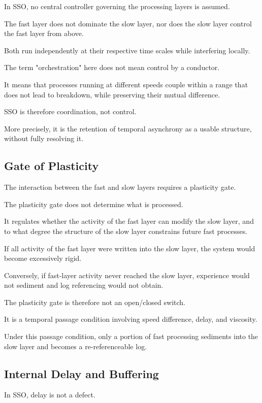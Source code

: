 In SSO, no central controller governing the processing layers is assumed.

The fast layer does not dominate the slow layer, nor does the slow layer control the fast layer from above.

Both run independently at their respective time scales while interfering locally.

The term "orchestration" here does not mean control by a conductor.

It means that processes running at different speeds couple within a range that does not lead to breakdown, while preserving their mutual difference.

SSO is therefore coordination, not control.

More precisely, it is the retention of temporal asynchrony as a usable structure, without fully resolving it.

\subsection{Gate of Plasticity}


The interaction between the fast and slow layers requires a plasticity gate.

The plasticity gate does not determine what is processed.

It regulates whether the activity of the fast layer can modify the slow layer, and to what degree the structure of the slow layer constrains future fast processes.

If all activity of the fast layer were written into the slow layer, the system would become excessively rigid.

Conversely, if fast-layer activity never reached the slow layer, experience would not sediment and log referencing would not obtain.

The plasticity gate is therefore not an open/closed switch.

It is a temporal passage condition involving speed difference, delay, and viscosity.

Under this passage condition, only a portion of fast processing sediments into the slow layer and becomes a re-referenceable log.

\subsection{Internal Delay and Buffering}


In SSO, delay is not a defect.

